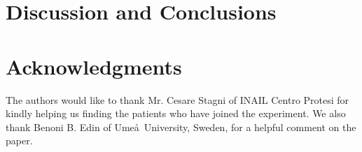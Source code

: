 \documentclass[review,12pt]{elsarticle}
\begin{document}
\section{Discussion and Conclusions}
\label{sec:disc}


\section*{Acknowledgments}

The authors would like to thank Mr. Cesare Stagni of INAIL Centro
Protesi for kindly helping us finding the patients who have joined the
experiment. We also thank Benoni B. Edin of Ume\aa\ University,
Sweden, for a helpful comment on the paper.



\end{document}
